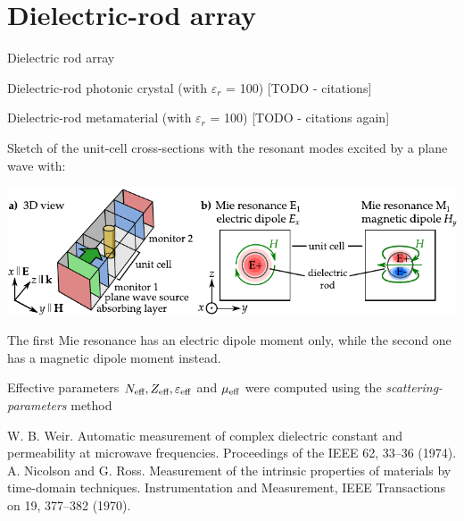 \documentclass[t]{beamer} \usepackage[english]{babel} \usepackage[utf8]{inputenc} \usetheme{Frankfurt} %
\begin{document}
\section{Dielectric-rod array}
\begin{frame}{Dielectric rod array}	%

Dielectric-rod photonic crystal (with $\varepsilon_r$ = 100)  [TODO - citations]

Dielectric-rod metamaterial (with $\varepsilon_r$ = 100) [TODO - citations again]

Sketch of the unit-cell cross-sections with the resonant modes excited by a plane wave with:

\centering \includegraphics[width=1\textwidth]{../img/ERods_1st_and_2nd_Mie_resonance_sketch.pdf}

The first Mie resonance has an electric dipole moment only, while the second one has a magnetic dipole moment instead. 

Effective parameters $N_{\text{eff} }, Z_{\text{eff} }, \varepsilon_{\text{eff} }$ and $\mu_{\text{eff} }$ were computed using the \textit{scattering-parameters} method

\begin{footnotesize}W. B. Weir. Automatic measurement of complex dielectric constant and permeability at microwave frequencies. Proceedings of the IEEE 62, 33–36 (1974).\\
A. Nicolson and G. Ross. Measurement of the intrinsic properties of materials by time-domain techniques. Instrumentation and Measurement, IEEE Transactions on 19, 377–382 (1970).
\end{footnotesize}
\end{frame} 		%
\end{document}
